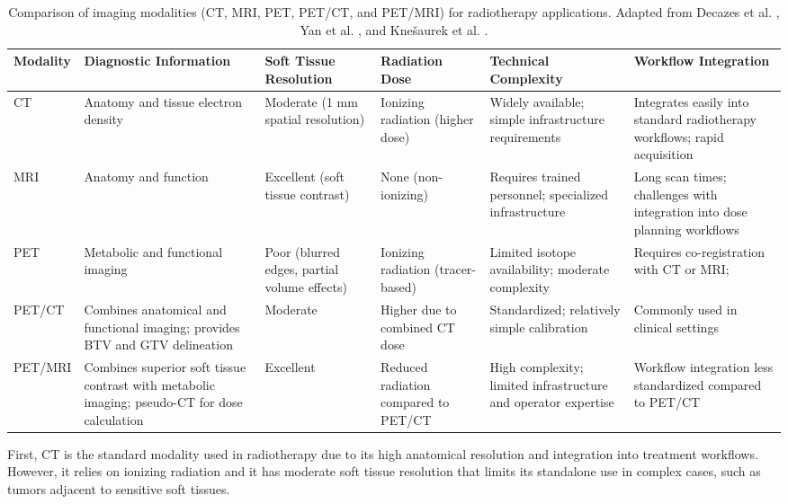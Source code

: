 \documentclass[11pt]{article} %
\begin{document}
\begin{table}[H]
\centering
\begin{tabular}{|l|>{\raggedright\arraybackslash}p{3.5cm}|>{\raggedright\arraybackslash}p{2.5cm}|>{\raggedright\arraybackslash}p{2.5cm}|>{\raggedright\arraybackslash}p{2.5cm}|>{\raggedright\arraybackslash}p{2.5cm}|}
\hline
\textbf{Modality} & \textbf{Diagnostic Information} & \textbf{Soft Tissue Resolution} & \textbf{Radiation Dose} & \textbf{Technical Complexity} & \textbf{Workflow Integration} \\ \hline
CT & Anatomy and tissue electron density & Moderate (1 mm spatial resolution) & Ionizing radiation (higher dose) & Widely available; simple infrastructure requirements & Integrates easily into standard radiotherapy workflows; rapid acquisition \\ \hline
MRI & Anatomy and function & Excellent (soft tissue contrast) & None (non-ionizing) & Requires trained personnel; specialized infrastructure & Long scan times; challenges with integration into dose planning workflows \\ \hline
PET & Metabolic and functional imaging & Poor (blurred edges, partial volume effects) & Ionizing radiation (tracer-based) & Limited isotope availability; moderate complexity   & Requires co-registration with CT or MRI; \\ \hline
PET/CT & Combines anatomical and functional imaging; provides BTV and GTV delineation & Moderate & Higher due to combined CT dose & Standardized; relatively simple calibration & Commonly used in clinical settings \\ \hline
PET/MRI & Combines superior soft tissue contrast with metabolic imaging; pseudo-CT for dose calculation & Excellent & Reduced radiation compared to PET/CT & High complexity; limited infrastructure and operator expertise & Workflow integration less standardized compared to PET/CT \\ \hline
\end{tabular}
\caption{Comparison of imaging modalities (CT, MRI, PET, PET/CT, and PET/MRI) for radiotherapy applications. Adapted from Decazes et al. \cite{decazes2021}, Yan et al. \cite{yan2024}, and Knešaurek et al. \cite{knesaurek2018}.}
\label{tab:modality_comparison}
\end{table}

First, CT is the standard modality used in radiotherapy due to its high anatomical resolution and integration into treatment workflows. However, it relies on ionizing radiation and it has moderate soft tissue resolution that limits its standalone use in complex cases, such as tumors adjacent to sensitive soft tissues. 
\end{document}
